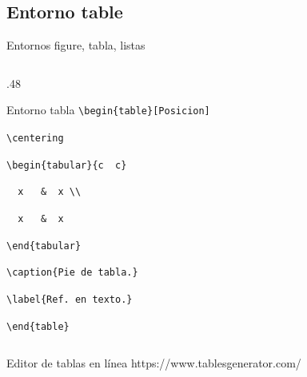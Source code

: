 \documentclass[aspectratio=169, 10pt]{beamer}
\begin{document}
\subsection{Entorno table}
\begin{frame}[fragile]{Entornos figure, tabla, listas}
\begin{columns}
    \begin{column}{.48\linewidth}
    \begin{block}{Entorno tabla}
        \verb|\begin{table}[Posicion]|
        
        \hspace{4.5mm}    \verb|\centering|
            
        \hspace{8.5mm}    \verb|\begin{tabular}{c  c}| 
            
        \hspace{8.5mm}    \verb|  x   &  x \\    |
            
        \hspace{8.5mm}    \verb|  x   &  x       |
            
        \hspace{8.5mm}    \verb|\end{tabular}|
            
        \hspace{4.5mm}    \verb|\caption{Pie de tabla.}|
        
        \hspace{4.5mm}\verb|\label{Ref. en texto.}|
            
        \verb|\end{table}|

    \end{block}    
    \end{column}
\end{columns}
\pause
\begin{alertblock}{Editor de tablas en línea}
    https://www.tablesgenerator.com/
\end{alertblock}

\end{frame}
\end{document}

